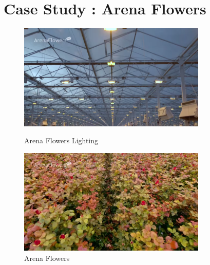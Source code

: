 \documentclass{article}
\begin{document}
\section{Case Study : Arena Flowers}


\begin{figure}[ht]
\centering
\includegraphics[width = 0.8\textwidth]{images/arena-light.png}
\caption{Arena Flowers Lighting}

\includegraphics[width=0.8\textwidth]{images/arena-flower.png}
\caption{Arena Flowers}
\end{figure}
\end{document}
